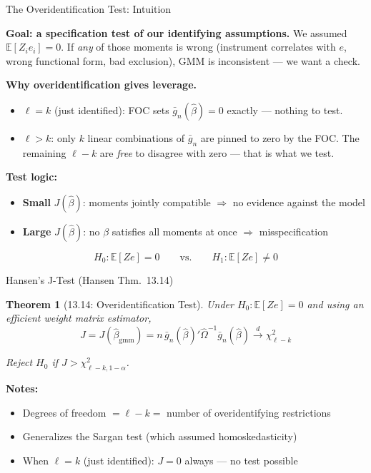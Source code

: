 \documentclass[aspectratio=169, handout]{beamer}
\newtheorem{thm}{Theorem}
\numberwithin{equation}{section}
\begin{document}
\begin{frame}{The Overidentification Test: Intuition}

\textbf{Goal: a specification test of our identifying assumptions.} We assumed $\mathbb{E}[Z_i e_i] = 0$. If \textit{any} of those moments is wrong (instrument correlates with $e$, wrong functional form, bad exclusion), GMM is inconsistent --- we want a check.

\medskip
\textbf{Why overidentification gives leverage.}
\begin{itemize}\itemsep=1pt
\item $\ell = k$ (just identified): FOC sets $\bar g_n(\hat\beta) = 0$ exactly --- \alert{nothing to test}.
\item $\ell > k$: only $k$ linear combinations of $\bar g_n$ are pinned to zero by the FOC. The remaining $\ell - k$ are \textit{free} to disagree with zero --- that is what we test.
\end{itemize}

\medskip
\textbf{Test logic:}
\begin{itemize}\itemsep=1pt
\item \textbf{Small} $J(\hat\beta)$: moments jointly compatible $\Rightarrow$ no evidence against the model
\item \textbf{Large} $J(\hat\beta)$: no $\beta$ satisfies all moments at once $\Rightarrow$ \alert{misspecification}
\end{itemize}

\smallskip
$$H_0: \mathbb{E}[Ze] = 0 \qquad\text{vs.}\qquad H_1: \mathbb{E}[Ze] \neq 0$$

\end{frame}

\begin{frame}{Hansen's J-Test (Hansen Thm.~13.14)}

\begin{thm}[13.14: Overidentification Test]
Under $H_0: \mathbb{E}[Ze] = 0$ and using an efficient weight matrix estimator,
$$J = J(\hat\beta_{\text{gmm}}) = n\,\bar{g}_n(\hat\beta)'\hat\Omega^{-1}\bar{g}_n(\hat\beta) \xrightarrow{d} \chi^2_{\ell - k}$$

Reject $H_0$ if $J > \chi^2_{\ell-k,1-\alpha}$.
\end{thm}

\medskip
\textbf{Notes:}
\begin{itemize}\itemsep=2pt
\item Degrees of freedom $= \ell - k =$ number of overidentifying restrictions
\item Generalizes the Sargan test (which assumed homoskedasticity)
\item When $\ell = k$ (just identified): $J = 0$ always --- \alert{no test possible}
\end{itemize}

\end{frame}
\end{document}
